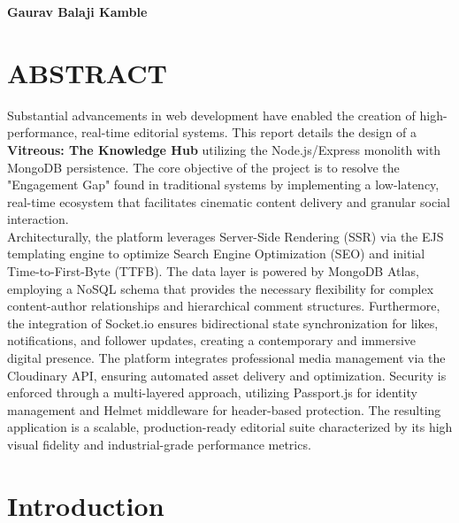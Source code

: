 \documentclass[12pt,a4paper]{report}
\begin{document}
\vspace{1cm}
\noindent
\textbf{Gaurav Balaji Kamble}

\newpage

\chapter*{ABSTRACT}

\indent Substantial advancements in web development have enabled the creation of high-performance, real-time editorial systems. This report details the design of a \textbf{Vitreous: The Knowledge Hub} utilizing the Node.js/Express monolith with MongoDB persistence. The core objective of the project is to resolve the "Engagement Gap" found in traditional systems by implementing a low-latency, real-time ecosystem that facilitates cinematic content delivery and granular social interaction.
\\
\indent Architecturally, the platform leverages Server-Side Rendering (SSR) via the EJS templating engine to optimize Search Engine Optimization (SEO) and initial Time-to-First-Byte (TTFB). The data layer is powered by MongoDB Atlas, employing a NoSQL schema that provides the necessary flexibility for complex content-author relationships and hierarchical comment structures. Furthermore, the integration of Socket.io ensures bidirectional state synchronization for likes, notifications, and follower updates, creating a contemporary and immersive digital presence.
The platform integrates professional media management via the Cloudinary API, ensuring automated asset delivery and optimization. Security is enforced through a multi-layered approach, utilizing Passport.js for identity management and Helmet middleware for header-based protection. The resulting application is a scalable, production-ready editorial suite characterized by its high visual fidelity and industrial-grade performance metrics.

\newpage

\tableofcontents
\newpage
\listoffigures
\newpage
\listoftables
\newpage

\chapter{Introduction}
\end{document}
